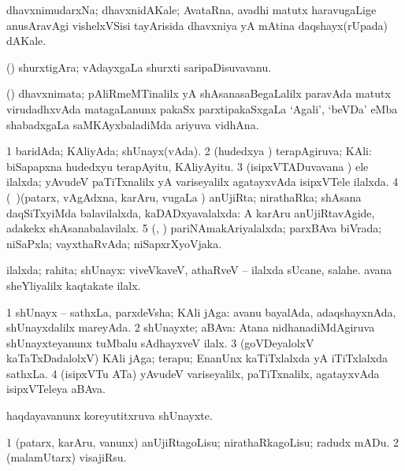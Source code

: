 \bentry 
{} 
\gl{\nA}
\expl{}
\bmng
 dhavxnimudarxNa; dhavxnidAKale; AvataRna, avadhi matutx haravugaLige anusAravAgi vishelxVSisi tayArisida dhavxniya yA mAtina daqshayx(rUpada) dAKale. 
\emng
\eentry

\bentry
{} 
\gl{\nA}
\expl{}
\bmng
 (\saM) shurxtigAra; vAdayxgaLa shurxti saripaDisuvavanu. 
\emng
\eentry

\bentry
{}
\gl{\nA}
\bmng
(\ame) dhavxnimata; pAliRmeMTinalilx yA shAsanasaBegaLalilx paravAda matutx virudadhxvAda matagaLanunx pakaSx parxtipakaSxgaLa `Agali', `beVDa' eMba shabadxgaLa saMKAyxbaladiMda ariyuva vidhAna. 
\emng
\eentry

\bentry 
{} 
\gl{\gu}
\expl{}
\bmng
\bnum
\num{1} baridAda; KAliyAda; shUnayx(vAda). 
\num{2} (hudedxya \vi) terapAgiruva; KAli:  biSapapxna hudedxyu terapAyitu, KAliyAyitu. 
\num{3} (isipxVTADuvavana \vi) ele ilalxda; yAvudeV paTiTxnalilx yA variseyalilx agatayxvAda isipxVTele ilalxda. 
\num{4} (\kanmu\ \nAyxshA)(patarx, vAgAdxna, karAru, \mo vugaLa \vi) anUjiRta; nirathaRka; shAsana daqSiTxyiMda balavilalxda, kaDADxyavalalxda:  A karAru anUjiRtavAgide, adakekx shAsanabalavilalx. 
\num{5} (\kAparx, \alaMshA) pariNAmakAriyalalxda; parxBAva biVrada; niSaPxla; vayxthaRvAda; niSapxrXyoVjaka. 
\enum
\emng

\noindent 
\gl{\pagu}
\expl{}
\bmng
  ilalxda; rahita; shUnayx:  viveVkaveV, athaRveV -- ilalxda sUcane, salahe.  avana sheYliyalilx kaqtakate ilalx. 
\emng
\eentry

\bentry 
{} 
\gl{\nA}
\expl{}
\bmng
\bnum
\num{1} shUnayx -- sathxLa, parxdeVsha; KAli jAga:  avanu bayalAda, adaqshayxnAda, shUnayxdalilx mareyAda. 
\num{2} shUnayxte; aBAva:  Atana nidhanadiMdAgiruva shUnayxteyanunx tuMbalu sAdhayxveV ilalx. 
\num{3} (goVDeyalolxV kaTaTxDadalolxV) KAli jAga; terapu; EnanUnx kaTiTxlalxda yA iTiTxlalxda sathxLa. 
\num{4} (isipxVTu ATa) yAvudeV variseyalilx, paTiTxnalilx, agatayxvAda isipxVTeleya aBAva. 
\enum
\emng

\noindent 
\gl{\pagu}
\expl{}
\bmng
  haqdayavanunx koreyutitxruva shUnayxte. 
\emng
\eentry

\bentry
{} 
\gl{\sakirx}
\expl{}
\bmng
\bnum
\num{1} (patarx, karAru, \mo vanunx) anUjiRtagoLisu; nirathaRkagoLisu; radudx mADu. 
\num{2} (malamUtarx) visajiRsu. 
\enum
\emng

